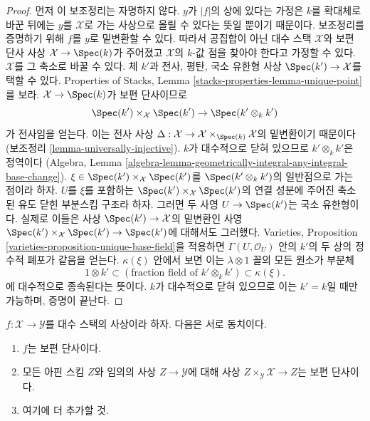 \begin{proof}
먼저 이 보조정리는 자명하지 않다. $y$가 $|f|$의 상에 있다는 가정은
$k$를 확대체로 바꾼 뒤에는 $y$를 $\mathcal{X}$로 가는 사상으로
올릴 수 있다는 뜻일 뿐이기 때문이다. 보조정리를 증명하기 위해 $f$를
$y$로 밑변환할 수 있다. 따라서 공집합이 아닌 대수 스택 $\mathcal{X}$와
보편 단사 사상 $\mathcal{X} \to \Spec(k)$가 주어졌고
$\mathcal{X}$의 $k$-값 점을 찾아야 한다고 가정할 수 있다.
$\mathcal{X}$를 그 축소로 바꿀 수 있다. 체 $k'$과 전사, 평탄, 국소 유한형
사상 $\Spec(k') \to \mathcal{X}$를 택할 수 있다. Properties of Stacks,
Lemma \ref{stacks-properties-lemma-unique-point}를 보라.
$\mathcal{X} \to \Spec(k)$가 보편 단사이므로
$$
\Spec(k') \times_\mathcal{X} \Spec(k') \to \Spec(k' \otimes_k k')
$$
가 전사임을 얻는다. 이는 전사 사상
$\Delta : \mathcal{X} \to \mathcal{X} \times_{\Spec(k)} \mathcal{X}$의
밑변환이기 때문이다(보조정리 \ref{lemma-universally-injective}).
$k$가 대수적으로 닫혀 있으므로 $k' \otimes_k k'$은 정역이다
(Algebra, Lemma
\ref{algebra-lemma-geometrically-integral-any-integral-base-change}).
$\xi \in \Spec(k') \times_\mathcal{X} \Spec(k')$를
$\Spec(k' \otimes_k k')$의 일반점으로 가는 점이라 하자.
$U$를 $\xi$를 포함하는
$\Spec(k') \times_\mathcal{X} \Spec(k')$의 연결 성분에 주어진 축소된
유도 닫힌 부분스킴 구조라 하자. 그러면 두 사영 $U \to \Spec(k')$는
국소 유한형이다. 실제로 이들은 사상 $\Spec(k') \to \mathcal{X}$의
밑변환인 사영
$\Spec(k') \times_\mathcal{X} \Spec(k') \to \Spec(k')$에 대해서도
그러했다. Varieties, Proposition
\ref{varieties-proposition-unique-base-field}을 적용하면
$\Gamma(U, \mathcal{O}_U)$ 안의 $k'$의 두 상의 정수적 폐포가 같음을 얻는다.
$\kappa(\xi)$ 안에서 보면 이는 $\lambda \otimes 1$ 꼴의 모든 원소가 부분체
$$
1 \otimes k' \subset 
(\text{fraction field of }k' \otimes_k k') \subset
\kappa(\xi).
$$
에 대수적으로 종속된다는 뜻이다. $k$가 대수적으로 닫혀 있으므로 이는
$k' = k$일 때만 가능하며, 증명이 끝난다.
\end{proof}

\begin{lemma}
\label{lemma-universally-injective-local}
$f : \mathcal{X} \to \mathcal{Y}$를 대수 스택의 사상이라 하자.
다음은 서로 동치이다.
\begin{enumerate}
\item $f$는 보편 단사이다.
\item 모든 아핀 스킴 $Z$와 임의의 사상 $Z \to \mathcal{Y}$에 대해 사상
$Z \times_\mathcal{Y} \mathcal{X} \to Z$는 보편 단사이다.
\item 여기에 더 추가할 것.%
\end{enumerate}
\end{lemma}

